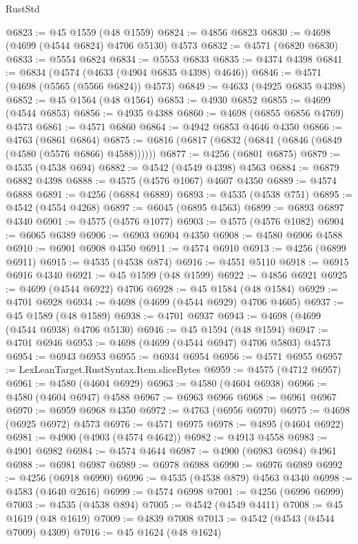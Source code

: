 \begin{lexlean}{RustStd}
\begin{coremodule}
@6823 := @45 @1559 (@48 @1559)
@6824 := @4856 @6823
@6830 := @4698 (@4699 (@4544 @6824) @4706 @5130) @4573
@6832 := @4571 (@6820 @6830)
@6833 := @5554 @6824
@6834 := @5553 @6833
@6835 := @4374 @4398
@6841 := @6834 (@4574 (@4633 (@4904 @6835 @4398) @4646))
@6846 := @4571 (@4698 (@5565 (@5566 @6824)) @4573)
@6849 := @4633 (@4925 @6835 @4398)
@6852 := @45 @1564 (@48 @1564)
@6853 := @4930 @6852
@6855 := @4699 (@4544 @6853)
@6856 := @4935 @4388
@6860 := @4698 (@6855 @6856 @4769) @4573
@6861 := @4571 @6860
@6864 := @4942 @6853 @4646 @4350
@6866 := @4763 (@6861 @6864)
@6875 := @6816 (@6817 (@6832 (@6841 (@6846 (@6849 (@4580 (@5576 @6866) @4588))))))
@6877 := @4256 (@6801 @6875)
@6879 := @4535 (@4538 @694)
@6882 := @4542 (@4549 @4398) @4563
@6884 := @6879 @6882 @4398
@6888 := @4575 (@4576 @1067) @4607 @4350
@6889 := @4574 @6888
@6891 := @4256 (@6884 @6889)
@6893 := @4535 (@4538 @751)
@6895 := @4542 (@4554 @4268)
@6897 := @6045 (@6895 @4563)
@6899 := @6893 @6897 @4340
@6901 := @4575 (@4576 @1077)
@6903 := @4575 (@4576 @1082)
@6904 := @6065 @6389
@6906 := @6903 @6904 @4350
@6908 := @4580 @6906 @4588
@6910 := @6901 @6908 @4350
@6911 := @4574 @6910
@6913 := @4256 (@6899 @6911)
@6915 := @4535 (@4538 @874)
@6916 := @4551 @5110
@6918 := @6915 @6916 @4340
@6921 := @45 @1599 (@48 @1599)
@6922 := @4856 @6921
@6925 := @4699 (@4544 @6922) @4706
@6928 := @45 @1584 (@48 @1584)
@6929 := @4701 @6928
@6934 := @4698 (@4699 (@4544 @6929) @4706 @4605)
@6937 := @45 @1589 (@48 @1589)
@6938 := @4701 @6937
@6943 := @4698 (@4699 (@4544 @6938) @4706 @5130)
@6946 := @45 @1594 (@48 @1594)
@6947 := @4701 @6946
@6953 := @4698 (@4699 (@4544 @6947) @4706 @5803) @4573
@6954 := @6943 @6953
@6955 := @6934 @6954
@6956 := @4571 @6955
@6957 := LexLeanTarget.RustSyntax.Item.sliceBytes
@6959 := @4575 (@4712 @6957)
@6961 := @4580 (@4604 @6929)
@6963 := @4580 (@4604 @6938)
@6966 := @4580 (@4604 @6947) @4588
@6967 := @6963 @6966
@6968 := @6961 @6967
@6970 := @6959 @6968 @4350
@6972 := @4763 (@6956 @6970)
@6975 := @4698 (@6925 @6972) @4573
@6976 := @4571 @6975
@6978 := @4895 (@4604 @6922)
@6981 := @4900 (@4903 (@4574 @4642))
@6982 := @4913 @4558
@6983 := @4901 @6982
@6984 := @4574 @4644
@6987 := @4900 (@6983 @6984) @4961
@6988 := @6981 @6987
@6989 := @6978 @6988
@6990 := @6976 @6989
@6992 := @4256 (@6918 @6990)
@6996 := @4535 (@4538 @879) @4563 @4340
@6998 := @4583 (@4640 @2616)
@6999 := @4574 @6998
@7001 := @4256 (@6996 @6999)
@7003 := @4535 (@4538 @894)
@7005 := @4542 (@4549 @4411)
@7008 := @45 @1619 (@48 @1619)
@7009 := @4839 @7008
@7013 := @4542 (@4543 (@4544 @7009) @4309)
@7016 := @45 @1624 (@48 @1624)

\end{coremodule}
\end{lexlean}
